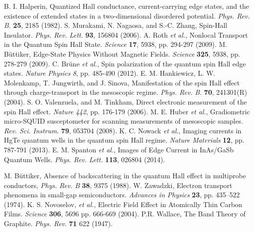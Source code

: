 \documentclass[titlepage,a4paper]{book}
\begin{document}
\begin{thebibliography}{199}
B. I. Halperin, Quantized Hall conductance, current-carrying edge states, and the existence of extended states in a two-dimensional disordered potential. \textit{Phys. Rev. B.} \textbf{25}, 2185 (1982).
S. Murakami, N. Nagaosa, and S.-C. Zhang, Spin-Hall Insulator. \textit{Phys. Rev. Lett.} \textbf{93}, 156804 (2006).
A. Roth  \textit{et al.}, Nonlocal Transport in the Quantum Spin Hall State. \textit{Science} \textbf{17}, 5938, pp. 294-297 (2009).
M. Büttiker, Edge-State Physics Without Magnetic Fields. \textit{Science} \textbf{325}, 5938, pp. 278-279 (2009).
C. Brüne \textit{et al.}, Spin polarization of the quantum spin Hall edge states. \textit{Nature Physics} \textit{8}, pp. 485-490 (2012).
E. M. Hankiewicz, L. W. Molenkamp, T. Jungwirth, and J. Sinova, Manifestation of the spin Hall effect through charge-transport in the mesoscopic regime. \textit{Phys. Rev. B.} \textbf{70}, 241301(R) (2004).  
S. O. Valenzuela, and M. Tinkham, Direct electronic measurement of the spin Hall effect. \textit{Nature} \textit{442}, pp. 176-179 (2006).
M. E. Huber \textit{et al.}, Gradiometric micro-SQUID susceptometer for scanning measurements of mesoscopic samples. \textit{Rev. Sci. Instrum.} \textbf{79}, 053704 (2008).
K. C. Nowack \textit{et al.}, Imaging currents in HgTe quantum wells in the quantum spin Hall regime. \textit{Nature Materials} \textbf{12}, pp. 787-791 (2013).
E. M. Spanton \textit{et al.}, Images of Edge Current in InAs/GaSb Quantum Wells. \textit{Phys. Rev. Lett.} \textbf{113}, 026804 (2014).


M. Büttiker, Absence of backscattering in the quantum Hall effect in multiprobe conductors, \textit{Phys. Rev. B} \textbf{38}, 9375 (1988).
W. Zawadzki, Electron transport phenomena in small-gap semiconductors. \textit{Advances in Physics} \textbf{23}, pp. 435–522 (1974).
K. S. Novoselov, \textit{et al.}, Electric Field Effect in Atomically Thin Carbon Films. \textit{Science} \textbf{306}, 5696 pp. 666-669 (2004).
P.R. Wallace, The Band Theory of Graphite. \textit{Phys. Rev.} \textbf{71} 622 (1947).


\end{thebibliography}
\end{document}
